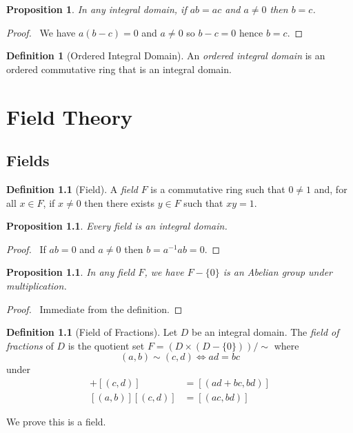 \documentclass{book}
\let\qed\relax
\newtheorem{prop}[ax]{Proposition}
\theoremstyle{definition}
\newtheorem{df}[ax]{Definition}
\begin{document}
\begin{prop}
\label{prop:multcancel}
In any integral domain, if $ab = ac$ and $a \neq 0$ then $b = c$.
\end{prop}

\begin{proof}
\pf\ We have $a(b-c) = 0$ and $a \neq 0$ so $b - c = 0$ hence $b = c$. \qed
\end{proof}

\begin{df}[Ordered Integral Domain]
An \emph{ordered integral domain} is an ordered commutative ring that is an integral domain.
\end{df}

\chapter{Field Theory}

\section{Fields}

\begin{df}[Field]
A \emph{field} $F$ is a commutative ring such that $0 \neq 1$ and, for all $x \in F$, if $x \neq 0$ then there exists $y \in F$ such that $xy = 1$.
\end{df}

\begin{prop}
Every field is an integral domain.
\end{prop}

\begin{proof}
\pf\ If $ab = 0$ and $a \neq 0$ then $b = a^{-1}ab = 0$. \qed
\end{proof}

\begin{prop}
In any field $F$, we have $F - \{0\}$ is an Abelian group under multiplication.
\end{prop}

\begin{proof}
\pf\ Immediate from the definition. \qed
\end{proof}

\begin{df}[Field of Fractions]
Let $D$ be an integral domain. The \emph{field of fractions} of $D$ is the quotient set $F = (D \times (D - \{0\})) / \sim$ where
\[ (a,b) \sim (c,d) \Leftrightarrow ad = bc \]
under
\begin{align*}
[(a,b)] + [(c,d)] & = [(ad+bc,bd)] \\
[(a,b)][(c,d)] & = [(ac,bd)]
\end{align*}

We prove this is a field.
\end{df}
\end{document}
